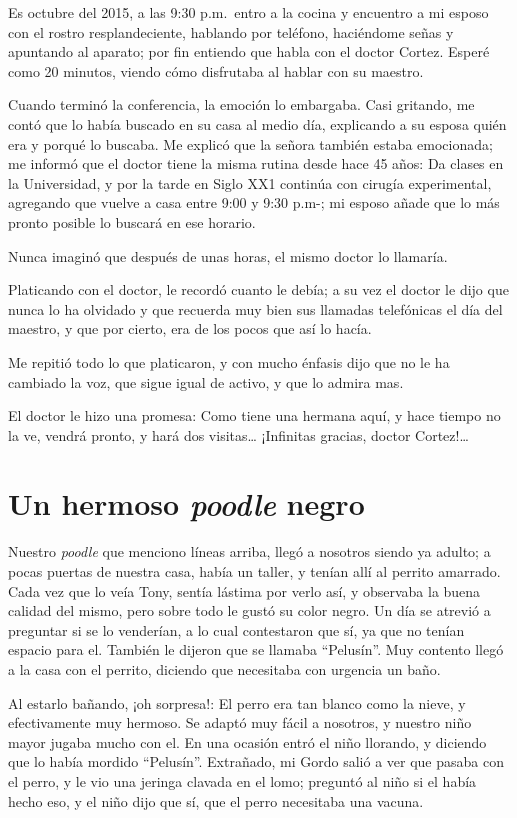 \documentclass[letterpaper, 12pt]{book}
\begin{document}
Es octubre del 2015, a las 9:30 p.m.\ entro a la cocina y encuentro a mi esposo con el rostro resplandeciente, hablando por teléfono, haciéndome señas y apuntando al aparato; por fin entiendo que habla con el doctor Cortez. Esperé como 20 minutos, viendo cómo disfrutaba al hablar con su maestro.

Cuando terminó la conferencia, la emoción lo embargaba. Casi gritando, me contó que lo había buscado en su casa al medio día, explicando a su esposa quién era y porqué lo buscaba. Me explicó que la señora también estaba emocionada; me informó que el doctor tiene la misma rutina desde hace 45 años: Da clases en la Universidad, y por la tarde en Siglo XX1 continúa con cirugía experimental, agregando que vuelve a casa entre 9:00 y 9:30 p.m-; mi esposo añade que lo más pronto posible lo buscará en ese horario.

Nunca imaginó que después de unas horas, el mismo doctor lo llamaría.

Platicando con el doctor, le recordó cuanto le debía; a su vez el doctor le dijo que nunca lo ha olvidado y que recuerda muy bien sus llamadas telefónicas el día del maestro, y que por cierto, era de los pocos que así lo hacía.

Me repitió todo lo que platicaron, y con mucho énfasis dijo que no le ha cambiado la voz, que sigue igual de activo, y que lo admira mas.

El doctor le hizo una promesa: Como tiene una hermana aquí, y hace tiempo no la ve, vendrá pronto, y hará dos visitas\ldots
¡Infinitas gracias, doctor Cortez!\ldots
\chapter{Un hermoso \textit{poodle} negro}
Nuestro \textit{poodle} que menciono líneas arriba, llegó a nosotros siendo ya adulto; a pocas puertas de nuestra casa, había un taller, y tenían allí al perrito amarrado. Cada vez que lo veía Tony, sentía lástima por verlo así, y observaba la buena calidad del mismo, pero sobre todo le gustó su color negro. Un día se atrevió a preguntar si se lo venderían, a lo cual contestaron que sí, ya que no tenían espacio para el. También le dijeron que se llamaba ``Pelusín''. Muy contento llegó a la casa con el perrito, diciendo que necesitaba con urgencia un baño.

Al estarlo bañando, ¡oh sorpresa!: El perro era tan blanco como la nieve, y efectivamente muy hermoso. Se adaptó muy fácil a nosotros, y nuestro niño mayor  jugaba mucho con el. En una ocasión entró el niño llorando, y diciendo que lo había mordido ``Pelusín''. Extrañado, mi Gordo salió a ver que pasaba con el perro, y le vio una jeringa clavada en el lomo; preguntó al niño si el había hecho eso, y el niño dijo que sí, que el perro necesitaba una vacuna.
\end{document}
